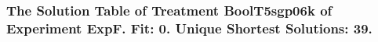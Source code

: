  \begin{frame}
 \fontsize{8pt}{9pt}\selectfont
 \frametitle{ The Solution Table of Treatment BoolT5sgp06k of Experiment ExpF. Fit: 0. Unique Shortest Solutions: 39. }

 \label{ExpFSolutionTable004.tex}  
 \end{frame}

